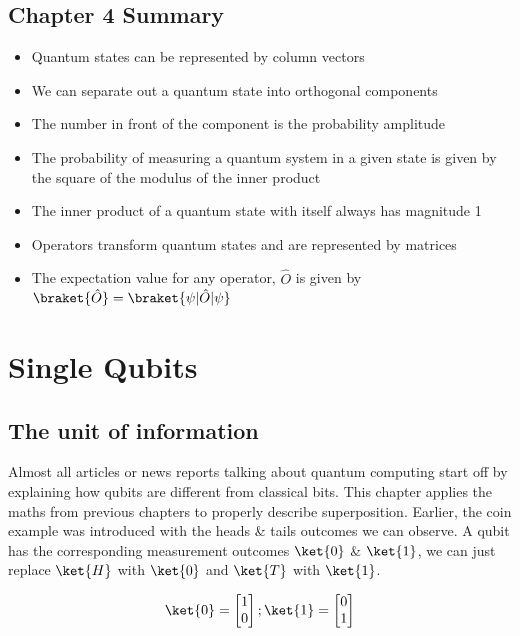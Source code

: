 \documentclass{book}
\begin{document}
\section{Chapter 4 Summary }

\begin{itemize}

    \item Quantum states can be represented by column vectors 
    \item We can separate out a quantum state into orthogonal components 
    \item The number in front of the component is the probability amplitude
    \item The probability of measuring a quantum system in a given state is given by the square of the modulus of the inner product
    \item The inner product of a quantum state with itself always has magnitude 1
    \item Operators transform quantum states and are represented by matrices
    \item The expectation value for any operator, $\hat{O}$  is given by $\braket{\hat{O}} = \braket{\psi|\hat{O}|\psi}$
\end{itemize}

\chapter{Single Qubits}

\section{ The unit of information}

Almost all articles or news reports talking about quantum computing start off by explaining how qubits are different from classical bits. This chapter applies the maths from previous chapters to properly describe superposition. Earlier, the coin example was introduced with the heads \& tails outcomes we can observe. A qubit has the corresponding measurement outcomes $\ket{0}$ \& $\ket{1}$, we can just replace $\ket{H}$ with $\ket{0}$ and $\ket{T}$ with $\ket{1}$. 

$$
\ket{0} = \begin{bmatrix} 1 \\ 0 \end{bmatrix} ; \ket{1} = \begin{bmatrix} 0 \\ 1 \end{bmatrix} 
$$
\end{document}
